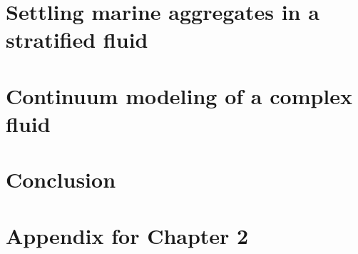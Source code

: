 \documentclass[11pt,oneside,chapterheads]{UCMerced}
\theoremstyle{plain}%
\theoremstyle{definition}
\begin{document}

\chapter{Settling marine aggregates in a stratified fluid}
\label{ch:3}
 

\chapter{Continuum modeling of a complex fluid}
\label{ch:4}
 

\chapter{Conclusion}
\label{ch:conclusion}
 

\printbibliography

\appendix
\chapter{Appendix for Chapter 2}

\end{document}
